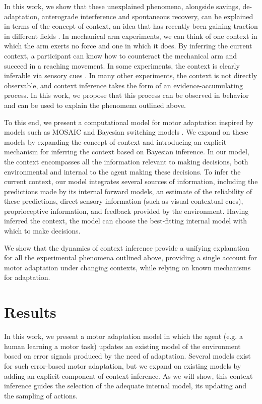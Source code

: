 \documentclass[a4paper,doc,floatsintext,natbib]{apa6}
\begin{document}
In this work, we show that these unexplained phenomena, alongside savings, de-adaptation, anterograde interference and spontaneous recovery, can be explained in terms of the concept of context, an idea that has recently been gaining traction in different fields \cite[e.g.][]{Sanders_Hippocampal_2020,Hunter_Contextsensitive_2021}. In mechanical arm experiments, we can think of one context in which the arm exerts no force and one in which it does. By inferring the current context, a participant can know how to counteract the mechanical arm and succeed in a reaching movement. In some experiments, the context is clearly inferable via sensory cues \cite[e.g.][]{Gandolfo_Motor_1996,Shadmehr_Adaptive_1994,Ethier_Spontaneous_2008}. In many other experiments, the context is not directly observable, and context inference takes the form of an evidence-accumulating process. In this work, we propose that this process can be observed in behavior and can be used to explain the phenomena outlined above.

To this end, we present a computational model for motor adaptation inspired by models such as MOSAIC \citep{Wolpert_Multiple_1998} and Bayesian switching models \citep{Kording_Bayesian_2004,Oh_Minimizing_2019}. We expand on these models by expanding the concept of context and introducing an explicit mechanism for inferring the context based on Bayesian inference. In our model, the context encompasses all the information relevant to making decisions, both environmental and internal to the agent making these decisions. To infer the current context, our model integrates several sources of information, including the predictions made by its internal forward models, an estimate of the reliability of these predictions, direct sensory information (such as visual contextual cues), proprioceptive information, and feedback provided by the environment. Having inferred the context, the model can choose the best-fitting internal model with which to make decisions.

We show that the dynamics of context inference provide a unifying explanation for all the experimental phenomena outlined above, providing a single account for motor adaptation under changing contexts, while relying on known mechanisms for adaptation.

\section{Results}
In this work, we present a motor adaptation model in which the agent (e.g. a human learning a motor task) updates an existing model of the environment based on error signals produced by the need of adaptation. Several models exist for such error-based motor adaptation, but we expand on existing models by adding an explicit component of context inference. As we will show, this context inference guides the selection of the adequate internal model, its updating and the sampling of actions.
\end{document}
